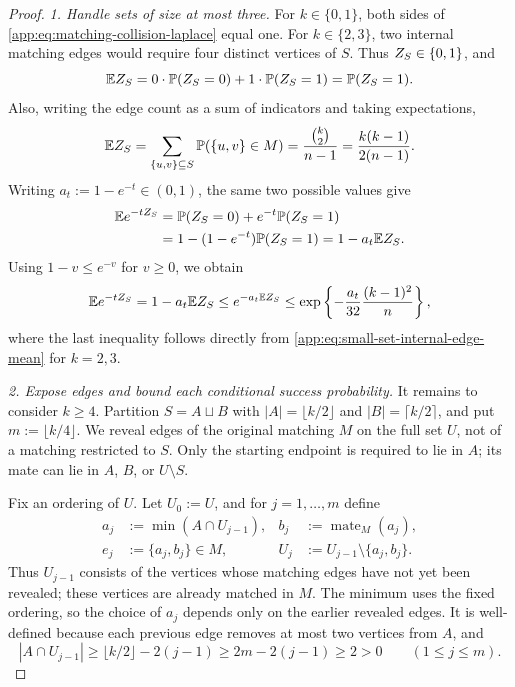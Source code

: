 \begin{proof}

\emph{1. Handle sets of size at most three.}
For \(k\in\{0,1\}\), both sides of
\eqref{app:eq:matching-collision-laplace} equal one. For
\(k\in\{2,3\}\), two internal matching edges would require four distinct
vertices of \(S\). Thus \(Z_{S}\in\{0,1\}\), and
\[
 \mathbb EZ_{S}
 =0\cdot\mathbb P(Z_{S}=0)
  +1\cdot\mathbb P(Z_{S}=1)
 =\mathbb P(Z_{S}=1).
\]
Also, writing the edge count as a sum of indicators and taking expectations,
\begin{equation}
 \mathbb E Z_{S}
 =\sum_{\{u,v\}\subseteq S}\mathbb P(\{u,v\}\in M)
 =\frac{\binom{k}{2}}{n-1}
 =\frac{k(k-1)}{2(n-1)}.
 \label{app:eq:small-set-internal-edge-mean}
\end{equation}
Writing \(a_t:=1-e^{-t}\in(0,1)\), the same two possible values give
\begin{align*}
 \mathbb E e^{-tZ_{S}}
 &=\mathbb P(Z_{S}=0)
   +e^{-t}\mathbb P(Z_{S}=1)\\
 &=1-(1-e^{-t})\mathbb P(Z_{S}=1)
 =1-a_t\mathbb EZ_{S}.
\end{align*}
Using \(1-v\le e^{-v}\) for \(v\ge0\), we obtain
\[
 \mathbb E e^{-tZ_{S}}
 =1-a_t\mathbb E Z_{S}
 \le e^{-a_t\mathbb E Z_{S}}
 \le
 \exp\left\{-\frac{a_t}{32}
                   \frac{(k-1)^2}{n}\right\},
\]
where the last inequality follows directly from
\eqref{app:eq:small-set-internal-edge-mean} for \(k=2,3\).


\emph{2. Expose edges and bound each conditional success probability.}
It remains to consider \(k\ge 4\). Partition \(S=A\sqcup B\) with
\(|A|=\lfloor k/2\rfloor\) and \(|B|=\lceil k/2\rceil\), and put
\(m:=\lfloor k/4\rfloor\). We reveal edges of the original matching
\(M\) on the full set \(U\), not of a matching restricted to \(S\).
Only the starting endpoint is required to lie in \(A\); its mate can lie
in \(A\), \(B\), or \(U\setminus S\).

Fix an ordering of \(U\). Let \(U_0:=U\), and for \(j=1,\ldots,m\) define
\begin{align*}
 a_j&:=\min(A\cap U_{j-1}),
 &b_j&:=\operatorname{mate}_{M}(a_j),\\
 e_j&:=\{a_j,b_j\}\in M,
 &U_j&:=U_{j-1}\setminus\{a_j,b_j\}.
\end{align*}
Thus \(U_{j-1}\) consists of the vertices whose matching edges have not yet
been revealed; these vertices are already matched in \(M\).
The minimum uses the fixed ordering, so the choice of \(a_j\) depends only
on the earlier revealed edges. It is well-defined because each previous
edge removes at most two vertices from \(A\), and
\[
 |A\cap U_{j-1}|
 \ge\lfloor k/2\rfloor-2(j-1)
 \ge2m-2(j-1)
 \ge2>0
 \qquad(1\le j\le m).
\]


\end{proof}
